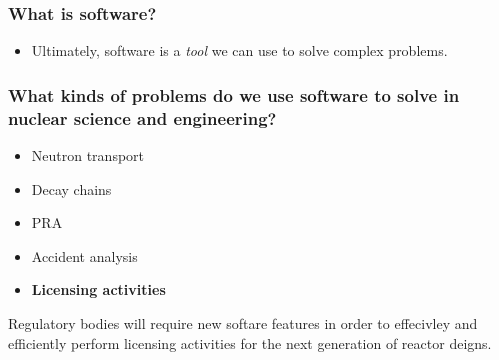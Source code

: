 \begin{frame}
  \frametitle{What is software?}
  \pause\medskip
  \begin{itemize}
      \item Ultimately, software is a {\it tool} we can use to solve complex problems.
  \end{itemize}
\end{frame}

\begin{frame}
    \frametitle{What kinds of problems do we use software to solve in nuclear science and engineering?}

    \pause\medskip
    \begin{itemize}
        \item Neutron transport
        \item Decay chains
        \item PRA
        \item Accident analysis
        \item {\bf Licensing activities}
    \end{itemize}

    Regulatory bodies will require new softare features in order to effecivley and efficiently perform licensing activities for the next generation of reactor deigns.

    
\end{frame}

